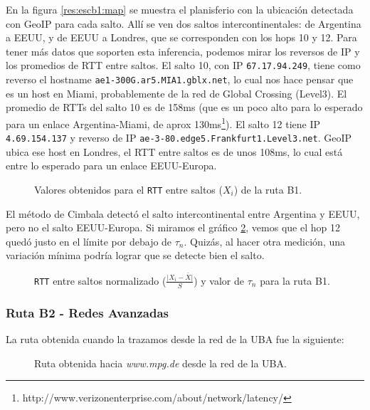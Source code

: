 En la figura \ref{res:escb1:map} se muestra el planisferio con la ubicación detectada con GeoIP para cada salto. Allí se ven dos saltos intercontinentales: de Argentina a EEUU, y de EEUU a Londres, que se corresponden con los hops 10 y 12. Para tener más datos que soporten esta inferencia, podemos mirar los reversos de IP y los promedios de RTT entre saltos. El salto 10, con IP \texttt{67.17.94.249}, tiene como reverso el hostname \texttt{ae1-300G.ar5.MIA1.gblx.net}, lo cual nos hace pensar que es un host en Miami, probablemente de la red de Global Crossing (Level3). El promedio de RTTs del salto 10 es de 158ms (que es un poco alto para lo esperado para un enlace Argentina-Miami, de aprox 130ms\footnote{http://www.verizonenterprise.com/about/network/latency/}). El salto 12 tiene IP \texttt{4.69.154.137} y reverso de IP \texttt{ae-3-80.edge5.Frankfurt1.Level3.net}. GeoIP ubica ese host en Londres, el RTT entre saltos es de unos 108ms, lo cual está entre lo esperado para un enlace EEUU-Europa.

\begin{figure}[H]
    \caption{Valores obtenidos para el \texttt{RTT} entre saltos ($X_i$) de la ruta B1.}
    \label{res:escb1:rtt}
\end{figure}

El método de Cimbala detectó el salto intercontinental entre Argentina y EEUU, pero no el salto EEUU-Europa. Si miramos el gráfico \ref{res:escb1:rttnorm}, vemos que el hop 12 quedó justo en el límite por debajo de $\tau_n$. Quizás, al hacer otra medición, una variación mínima podría lograr que se detecte bien el salto.

\begin{figure}[H]
    \caption{\texttt{RTT} entre saltos normalizado ($\frac{\vert X_i-\bar{X}\vert}{S}$)
    y valor de $\tau_n$ para la ruta B1.}
    \label{res:escb1:rttnorm}
\end{figure}

\subsubsection{Ruta B2 - Redes Avanzadas}

La ruta obtenida cuando la trazamos desde la red de la UBA fue la siguiente:

\begin{figure}[H]
    \caption{Ruta obtenida hacia \emph{www.mpg.de} desde la red de la UBA.}
    \label{res:escB1:table}
\end{figure}

